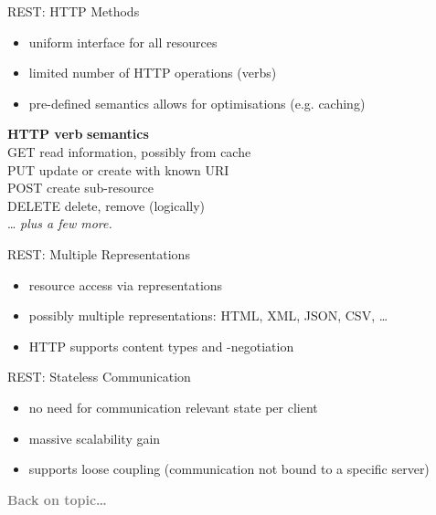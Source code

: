 \documentclass{beamer}
\begin{document}
\begin{frame}{REST: HTTP Methods}
  \begin{itemize}
    \item uniform interface for all resources
    \item limited number of HTTP operations (verbs)
    \item pre-defined semantics allows for optimisations (e.g. caching)
  \end{itemize}

  \begin{tabbing}
    {\bfseries HTTP verb} \hspace{0.3cm} \= {\bfseries semantics} \\
    GET    \>  read information, possibly from cache\\
    PUT    \>  update or create with known URI\\
    POST   \>  create sub-resource \\
    DELETE \>  delete, remove (logically)\\
    \dots  \>  \textit{plus a few more.}
  \end{tabbing}
\end{frame}

\begin{frame}{REST: Multiple Representations}
  \begin{itemize}
    \item resource access via representations
    \item possibly multiple representations: HTML, XML, JSON, CSV, \dots
    \item HTTP supports content types and -negotiation
  \end{itemize}
\end{frame}

\begin{frame}{REST: Stateless Communication}

  \begin{itemize}
    \item no need for communication relevant state per client
    \item massive scalability gain
    \item supports loose coupling (communication not bound to a specific server)
  \end{itemize}
\end{frame}

\begin{frame}
  \vspace*{-1cm}
  \textcolor{gray}{
    \begin{center}
      \textbf{
        \fontsize{60}{60}\selectfont Back on topic\dots
      }
    \end{center}
  }
\end{frame}
\end{document}
